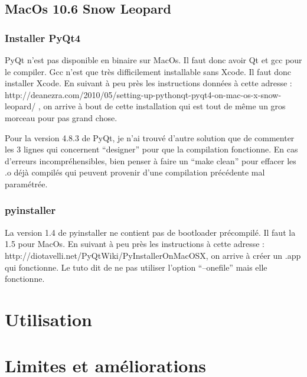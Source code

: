 \documentclass[12pt,a4paper]{article}
\begin{document}
    \subsection{MacOs 10.6 Snow Leopard}
        \subsubsection{Installer PyQt4}
        PyQt n'est pas disponible en binaire sur MacOs. Il faut donc avoir Qt et gcc pour le compiler. 
        Gcc n'est que très difficilement installable sans Xcode. Il faut donc installer Xcode.
        En suivant à peu près les instructions données à cette adresse : http://deanezra.com/2010/05/setting-up-pythonqt-pyqt4-on-mac-os-x-snow-leopard/
        , on arrive à bout de cette installation qui est tout de même un gros morceau pour pas grand chose.
    
        Pour la version 4.8.3 de PyQt, je n'ai trouvé d'autre solution que de commenter les 3 lignes qui concernent
        ``designer'' pour que la compilation fonctionne. En cas d'erreurs incompréhensibles, bien penser à faire un ``make clean''
        pour effacer les .o déjà compilés qui peuvent provenir d'une compilation précédente mal paramétrée.

        \subsubsection{pyinstaller}
        La version 1.4 de pyinstaller ne contient pas de bootloader précompilé. Il faut la 1.5 pour MacOs.
        En suivant à peu près les instructions à cette adresse : http://diotavelli.net/PyQtWiki/PyInstallerOnMacOSX, on arrive à créer un 
        .app qui fonctionne. Le tuto dit de ne pas utiliser l'option ``--onefile'' mais elle fonctionne.

\section{Utilisation}

\section{Limites et améliorations}
\end{document}
